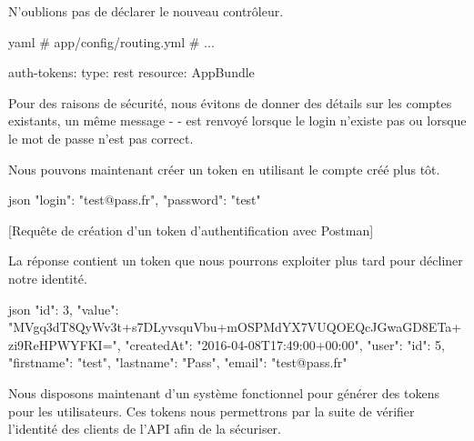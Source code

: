 \documentclass[big]{zmdocument}
\begin{document}
N'oublions pas de déclarer le nouveau contrôleur.



\begin{CodeBlock}{yaml}
# app/config/routing.yml
# ...

auth-tokens:
    type:     rest
    resource: AppBundle\Controller\AuthTokenController
\end{CodeBlock}



\begin{Information}
Pour des raisons de sécurité, nous évitons de donner des  détails sur les comptes existants, un même message -  - est renvoyé lorsque le login n'existe pas ou lorsque le mot de passe n'est pas correct.
\end{Information}


Nous pouvons maintenant créer un token en utilisant le compte  créé plus tôt.



\begin{CodeBlock}{json}
{
    "login": "test@pass.fr",
    "password": "test"
}
\end{CodeBlock}



[Requête de création d'un token d'authentification avec Postman]


La réponse contient un token que nous pourrons exploiter plus tard pour décliner notre identité.



\begin{CodeBlock}{json}
{
  "id": 3,
  "value": "MVgq3dT8QyWv3t+s7DLyvsquVbu+mOSPMdYX7VUQOEQcJGwaGD8ETa+zi9ReHPWYFKI=",
  "createdAt": "2016-04-08T17:49:00+00:00",
  "user": {
    "id": 5,
    "firstname": "test",
    "lastname": "Pass",
    "email": "test@pass.fr"
  }
}
\end{CodeBlock}



\horizontalLine



Nous disposons maintenant d'un système fonctionnel pour générer des tokens pour les utilisateurs. Ces tokens nous permettrons par la suite de vérifier l'identité des clients de l'API afin de la sécuriser.



\end{document}
